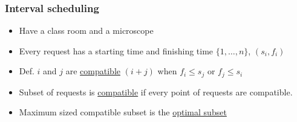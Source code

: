 \documentclass[11pt]{article}
\begin{document}
\subsubsection{Interval scheduling}
\label{sec:org48c90b0}
\begin{itemize}
\item Have a class room and a microscope
\item Every request has a starting time and finishing time \(\{1,\ldots, n\}\), \((s_i,f_i)\)
\item Def. \(i\) and \(j\) are \uline{compatible} \((i+j)\) when \(f_i \leq s_j\) or \(f_j \leq s_i\)
\item Subset of requests is \uline{compatible} if every point of requests are compatible.
\item Maximum sized compatible subset is the \uline{optimal subset}
\end{itemize}
\end{document}
